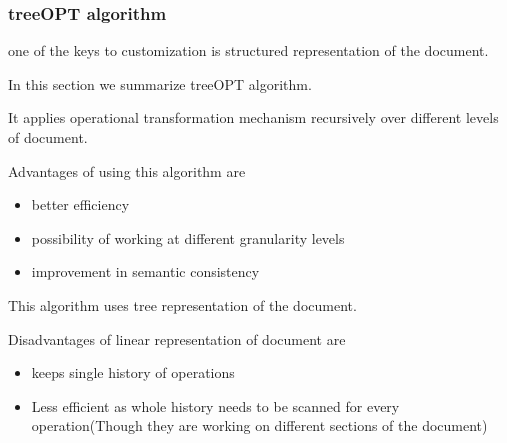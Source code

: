   
  
  
  
  
  
  
  
  
  
  
  
  
  
  
  \subsubsection{treeOPT algorithm}\cite{2003}
  
    one of the keys to customization is structured representation of the document.
  
    In this section we summarize treeOPT algorithm.
 
   It applies operational transformation mechanism recursively over different levels of document.
  
  Advantages of using this algorithm are
  \begin{itemize}
  \item better efficiency
  
  \item possibility of working at different granularity levels
  
 \item improvement in semantic consistency
 \end{itemize}
 











   This algorithm  uses tree representation of the document.
  
    Disadvantages of linear representation of document are
    \begin{itemize}
    \item {
    keeps single history of operations
    }
    \item{ 
    Less efficient as whole history needs to be scanned for every operation(Though they are working on different sections of the document)
    }
    \end{itemize}








  




